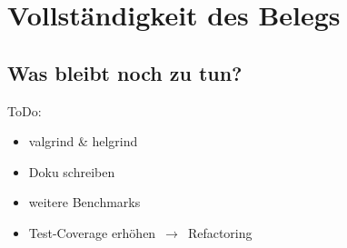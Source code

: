 \documentclass{beamer}
\begin{document}
\section{Vollständigkeit des Belegs}
\subsection{Was bleibt noch zu tun?}
\begin{frame}
ToDo:
\begin{itemize}
  \item valgrind \& helgrind
  \item Doku schreiben
  \item weitere Benchmarks
  \item Test-Coverage erhöhen $\,\to\,$ Refactoring
\end{itemize}
\end{frame}
\end{document}
